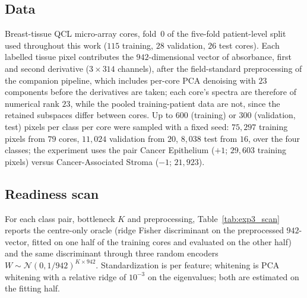 
\subsection{Data}
Breast-tissue QCL micro-array cores, fold~0 of the five-fold patient-level
split used throughout this work ($115$ training, $28$ validation, $26$ test
cores). Each labelled tissue pixel contributes the $942$-dimensional vector
of absorbance, first and second derivative ($3\times314$ channels), after
the field-standard preprocessing of the companion pipeline, which includes
per-core PCA denoising with $23$ components before the derivatives are
taken; each core's spectra are therefore of numerical rank $23$, while the
pooled training-patient data are not, since the retained subspaces differ
between cores. Up to
$600$ (training) or $300$ (validation, test) pixels per class per core were
sampled with a fixed seed: $75{,}297$ training pixels from $79$ cores,
$11{,}024$ validation from $20$, $8{,}038$ test from $16$, over the four
classes; the experiment uses the pair Cancer Epithelium ($+1$; $29{,}603$
training pixels) versus Cancer-Associated Stroma ($-1$; $21{,}923$).

\subsection{Readiness scan}
For each class pair, bottleneck $K$ and preprocessing, Table~\ref{tab:exp3_scan}
reports the centre-only oracle (ridge Fisher discriminant on the preprocessed
$942$-vector, fitted on one half of the training cores and evaluated on the
other half) and the same discriminant through three random encoders
$W\sim\mathcal N(0,1/942)^{K\times942}$. Standardization is per feature;
whitening is PCA whitening with a relative ridge of $10^{-3}$ on the
eigenvalues; both are estimated on the fitting half.

